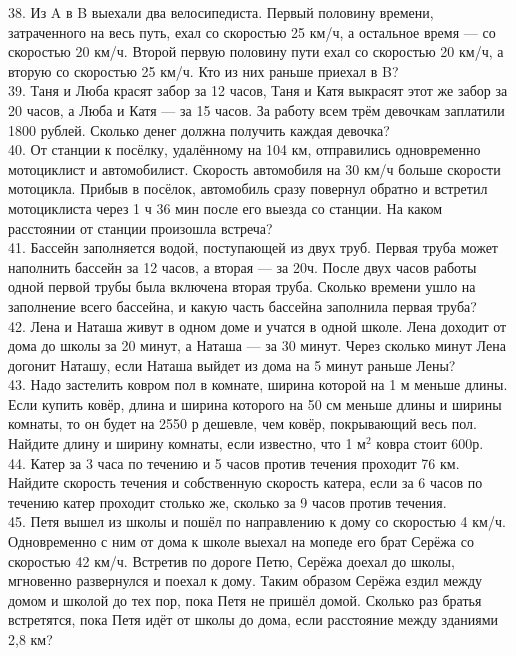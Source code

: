 \documentclass[12pt]{article}
\begin{document}
38. Из A в B выехали два велосипедиста. Первый половину времени, затраченного на весь путь, ехал со скоростью 25 км/ч, а остальное время --- со скоростью 20 км/ч. Второй первую половину пути ехал со скоростью 20 км/ч, а вторую со скоростью 25 км/ч. Кто из них раньше приехал в B?\\
39. Таня и Люба красят забор за 12 часов, Таня и Катя выкрасят этот же забор за 20 часов, а Люба и Катя --- за 15 часов. За работу всем трём девочкам заплатили 1800 рублей. Сколько денег должна получить каждая девочка?\\
40. От станции к посёлку, удалённому на 104 км, отправились одновременно мотоциклист и автомобилист. Скорость автомобиля на 30 км/ч больше скорости мотоцикла. Прибыв в посёлок, автомобиль сразу повернул обратно и встретил мотоциклиста через 1 ч 36 мин после его выезда со станции. На каком расстоянии от станции произошла встреча?\\
41. Бассейн заполняется водой, поступающей из двух труб. Первая труба может наполнить бассейн за 12 часов, а вторая --- за 20ч. После двух часов работы одной первой трубы была включена вторая труба. Сколько времени ушло на заполнение всего бассейна, и какую часть бассейна заполнила первая труба?\\
42. Лена и Наташа живут в одном доме и учатся в одной школе. Лена доходит от дома до школы за 20 минут, а Наташа --- за 30 минут. Через сколько минут Лена догонит Наташу, если Наташа выйдет из дома на 5 минут раньше Лены?\\
43. Надо застелить ковром пол в комнате, ширина которой на 1 м меньше длины. Если купить ковёр, длина и ширина которого на 50 см меньше длины и ширины комнаты, то он будет на 2550 р дешевле, чем ковёр, покрывающий весь пол. Найдите длину и ширину комнаты, если известно, что 1 $\text{м}^2$ ковра стоит 600р.\\
44. Катер за 3 часа по течению и 5 часов против течения проходит 76 км. Найдите скорость течения и собственную скорость катера, если за 6 часов по течению катер проходит столько же, сколько за 9 часов против течения.\\
45. Петя вышел из школы и пошёл по направлению к дому со скоростью 4 км/ч. Одновременно с ним от дома к школе выехал на мопеде его брат Серёжа со скоростью 42 км/ч. Встретив по дороге Петю, Серёжа доехал до школы, мгновенно развернулся и поехал к дому. Таким образом Серёжа ездил между домом и школой до тех пор, пока Петя не пришёл домой. Сколько раз братья встретятся, пока Петя идёт от школы до дома, если расстояние между зданиями 2,8 км?\\
\end{document}
